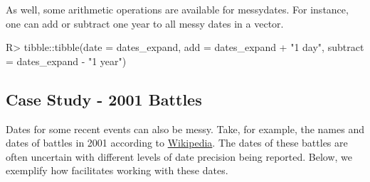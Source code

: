 \documentclass[
]{jss}
\begin{document}
As well, some arithmetic operations are available for messydates. For
instance, one can add or subtract one year to all messy dates in a
vector.

\begin{CodeChunk}
\begin{CodeInput}
R> tibble::tibble(date = dates_expand, add = dates_expand + "1 day", subtract = dates_expand - "1 year")
\end{CodeInput}
\begin{CodeOutput}
# A tibble: 7 x 3
  date                    add                                           subtract
  <mdate>                 <mdate>                                       <mdate> 
1 2001-01-01              2001-01-02                                  ~ 2000-01~
2 2001-01?                2001-01-02..2001-02-01                      ~ 2000-01~
3 2001                    2001-01-02..2002-01-01                      ~ 2000-01~
4 2001-01-01..2001-02-02  2001-01-02..2001-02-03                      ~ 2000-01~
5 {2001-01-01,2001-02-02} {2001-01-02,2001-02-03}                     ~ {2000-0~
6 2001-XX-31              {2001-02-01,2001-03-01,2001-04-01,2001-05-01~ {2000-0~
7 -0021                   -0020-12-31..-0021-12-30                    ~ -0022  ~
\end{CodeOutput}
\end{CodeChunk}

\hypertarget{case-study---2001-battles}{%
\subsection{Case Study - 2001 Battles}\label{case-study---2001-battles}}

Dates for some recent events can also be messy. Take, for example, the
names and dates of battles in 2001 according to
\href{https://en.wikipedia.org/wiki/List_of_battles_in_the_21st_century}{Wikipedia}.
The dates of these battles are often uncertain with different levels of
date precision being reported. Below, we exemplify how 
facilitates working with these dates.
\end{document}
